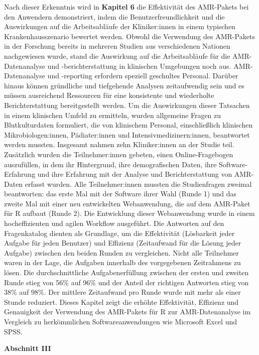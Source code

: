 \documentclass[
]{book}
\begin{document}
Nach dieser Erkenntnis wird in \textbf{Kapitel 6} die Effektivität des AMR-Pakets bei den Anwendern demonstriert, indem die Benutzerfreundlichkeit und die Auswirkungen auf die Arbeitsabläufe der Kliniker:innen in einem typischen Krankenhausszenario bewertet werden. Obwohl die Verwendung des AMR-Pakets in der Forschung bereits in mehreren Studien aus verschiedenen Nationen nachgewiesen wurde, stand die Auswirkung auf die Arbeitsabläufe für die AMR-Datenanalyse und -berichterstattung in klinischen Umgebungen noch aus. AMR-Datenanalyse und -reporting erfordern speziell geschultes Personal. Darüber hinaus können gründliche und tiefgehende Analysen zeitaufwendig sein und es müssen ausreichend Ressourcen für eine konsistente und wiederholte Berichterstattung bereitgestellt werden. Um die Auswirkungen dieser Tatsachen in einem klinischen Umfeld zu ermitteln, wurden allgemeine Fragen zu Blutkulturdaten formuliert, die von klinischem Personal, einschließlich klinischen Mikrobiologen:innen, Pädiater:innen und Intensivmedizinern:innen, beantwortet werden mussten. Insgesamt nahmen zehn Kliniker:innen an der Studie teil. Zusätzlich wurden die Teilnehmer:innen gebeten, einen Online-Fragebogen auszufüllen, in dem ihr Hintergrund, ihre demografischen Daten, ihre Software-Erfahrung und ihre Erfahrung mit der Analyse und Berichterstattung von AMR-Daten erfasst wurden. Alle Teilnehmer:innen mussten die Studienfragen zweimal beantworten: das erste Mal mit der Software ihrer Wahl (Runde 1) und das zweite Mal mit einer neu entwickelten Webanwendung, die auf dem AMR-Paket für R aufbaut (Runde 2). Die Entwicklung dieser Webanwendung wurde in einem hocheffizienten und agilen Workflow ausgeführt. Die Antworten auf den Fragenkatalog dienten als Grundlage, um die Effektivität (Lösbarkeit jeder Aufgabe für jeden Benutzer) und Effizienz (Zeitaufwand für die Lösung jeder Aufgabe) zwischen den beiden Runden zu vergleichen. Nicht alle Teilnehmer waren in der Lage, die Aufgaben innerhalb des vorgegebenen Zeitrahmens zu lösen. Die durchschnittliche Aufgabenerfüllung zwischen der ersten und zweiten Runde stieg von 56\% auf 96\% und der Anteil der richtigen Antworten stieg von 38\% auf 98\%. Der mittlere Zeitaufwand pro Runde wurde mit mehr als einer Stunde reduziert. Dieses Kapitel zeigt die erhöhte Effektivität, Effizienz und Genauigkeit der Verwendung des AMR-Pakets für R zur AMR-Datenanalyse im Vergleich zu herkömmlichen Softwareanwendungen wie Microsoft Excel und SPSS.

\textbf{Abschnitt III}
\end{document}

